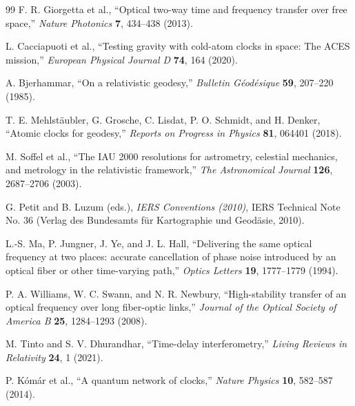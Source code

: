 \documentclass[11pt,a4paper]{article}
\begin{document}
\begin{thebibliography}{99}
F. R. Giorgetta et al., ``Optical two-way time and frequency transfer over free space,'' \emph{Nature Photonics} \textbf{7}, 434--438 (2013).

L. Cacciapuoti et al., ``Testing gravity with cold-atom clocks in space: The ACES mission,'' \emph{European Physical Journal D} \textbf{74}, 164 (2020).

A. Bjerhammar, ``On a relativistic geodesy,'' \emph{Bulletin Géodésique} \textbf{59}, 207--220 (1985).

T. E. Mehlstäubler, G. Grosche, C. Lisdat, P. O. Schmidt, and H. Denker, ``Atomic clocks for geodesy,'' \emph{Reports on Progress in Physics} \textbf{81}, 064401 (2018).

M. Soffel et al., ``The IAU 2000 resolutions for astrometry, celestial mechanics, and metrology in the relativistic framework,'' \emph{The Astronomical Journal} \textbf{126}, 2687--2706 (2003).

G. Petit and B. Luzum (eds.), \emph{IERS Conventions (2010)}, IERS Technical Note No. 36 (Verlag des Bundesamts für Kartographie und Geodäsie, 2010).

L.-S. Ma, P. Jungner, J. Ye, and J. L. Hall, ``Delivering the same optical frequency at two places: accurate cancellation of phase noise introduced by an optical fiber or other time-varying path,'' \emph{Optics Letters} \textbf{19}, 1777--1779 (1994).

P. A. Williams, W. C. Swann, and N. R. Newbury, ``High-stability transfer of an optical frequency over long fiber-optic links,'' \emph{Journal of the Optical Society of America B} \textbf{25}, 1284--1293 (2008).

M. Tinto and S. V. Dhurandhar, ``Time-delay interferometry,'' \emph{Living Reviews in Relativity} \textbf{24}, 1 (2021).

P. Kómár et al., ``A quantum network of clocks,'' \emph{Nature Physics} \textbf{10}, 582--587 (2014).

\end{thebibliography}
\end{document}
